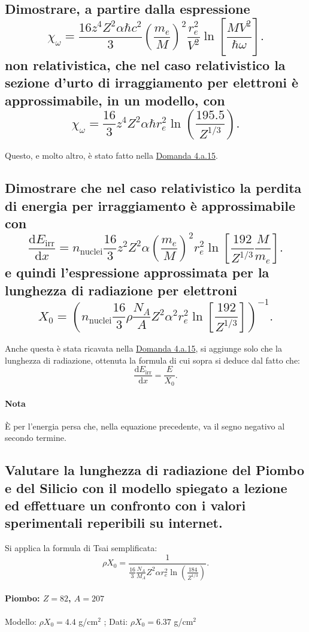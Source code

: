 \subsection[]{Dimostrare, a partire dalla espressione
\[
	\chi_{\omega} = \frac{16 z^4 Z^2 \alpha \hbar c^2}{3} \left( \frac{m_e}{M} \right)^2 \frac{r_e^2}{V^2}\ln\left[ \frac{MV^2}{\hbar \omega} \right] 
.\] 
non relativistica, che nel caso relativistico la sezione d’urto di irraggiamento per elettroni è approssimabile, in un modello, con 
\[
	\chi_{\omega} = \frac{16}{3}z^4 Z^2\alpha\hbar r_e^2\ln\left( \frac{195.5}{Z^{1 /3}} \right) 
.\] 
}
\label{sec:4.b.8}
Questo, e molto altro, è stato fatto nella \hyperref[sec:4.a.15]{Domanda 4.a.15}.

\subsection[]{Dimostrare che nel caso relativistico la perdita di energia per irraggiamento è approssimabile con 
\[
	\frac{\mbox{d} E_{\text{irr}}}{\mbox{d} x} = n_{\text{nuclei}} \frac{16}{3}z^2Z^2\alpha\left( \frac{m_e}{M} \right) ^2r_e^2\ln\left[ \frac{192}{Z^{1 /3}}\frac{M}{m_e} \right] 
.\] 
e quindi l'espressione approssimata per la lunghezza di radiazione per elettroni
\[
	X_0= \left( n_{\text{nuclei}} \frac{16}{3}\rho \frac{N_{A}}{A}  Z^2\alpha ^2r_e^2\ln\left[ \frac{192}{Z^{1 /3}}\right] \right)^{-1} 
.\] 
}
\label{sec:4.b.9}
Anche questa è stata ricavata nella \hyperref[sec:4.a.15]{Domanda 4.a.15}, si aggiunge solo che la lunghezza di radiazione, ottenuta la formula di cui sopra si deduce dal fatto che:
\[
	\frac{\mbox{d} E_{\text{irr}}}{\mbox{d} x} = \frac{E}{X_0}
.\] 
\paragraph{Nota}%
 È per l'energia persa che, nella equazione precedente, va il segno negativo al secondo termine.

\subsection[]{Valutare la lunghezza di radiazione del Piombo e del Silicio con il modello spiegato a lezione ed effettuare un confronto con i valori sperimentali reperibili su internet.
}
\label{sec:4.b.10}
Si applica la formula di Tsai semplificata:
\[
	\rho X_0 = \frac{1}{\frac{16}{3} \frac{N_{A}}{M_A}Z^2\alpha r_e^2 \ln \left(\frac{184}{Z^{1 /3}}\right)}
.\] 
\paragraph{Piombo: $Z=82$, $A=207$} Modello: $\rho X_0= 4.4$ g/cm$^2$ ; Dati: $\rho X_0= 6.37$ g/cm$^2$ 
